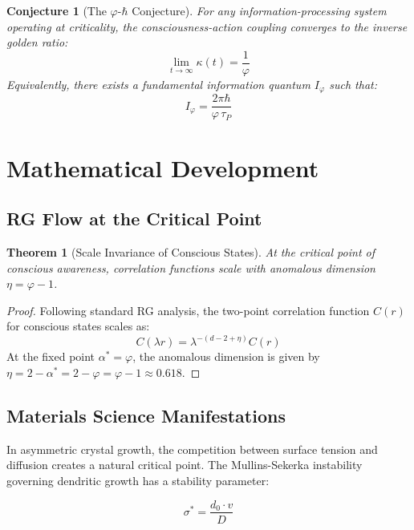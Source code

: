 \documentclass[14pt, a4paper]{extarticle}
\newtheorem{conjecture}{Conjecture}
\newtheorem{theorem}{Theorem}
\begin{document}
\begin{conjecture}[The $\varphi$-$\hbar$ Conjecture]
For any information-processing system operating at criticality, the consciousness-action coupling converges to the inverse golden ratio:
\begin{equation}
\lim_{t \to \infty} \kappa(t) = \frac{1}{\varphi}
\label{eq:main_conjecture}
\end{equation}
Equivalently, there exists a fundamental information quantum $I_\varphi$ such that:
\begin{equation}
I_\varphi = \frac{2\pi\hbar}{\varphi \, \tau_P}
\end{equation}
\end{conjecture}

\section{Mathematical Development}

\subsection{RG Flow at the Critical Point}

\begin{theorem}[Scale Invariance of Conscious States]
At the critical point of conscious awareness, correlation functions scale with anomalous dimension $\eta = \varphi - 1$.
\end{theorem}

\begin{proof}
Following standard RG analysis, the two-point correlation function $C(r)$ for conscious states scales as:
\begin{equation}
C(\lambda r) = \lambda^{-(d - 2 + \eta)} C(r)
\end{equation}
At the fixed point $\alpha^* = \varphi$, the anomalous dimension is given by $\eta = 2 - \alpha^* = 2 - \varphi = \varphi - 1 \approx 0.618$.
\end{proof}

\subsection{Materials Science Manifestations}

In asymmetric crystal growth, the competition between surface tension and diffusion creates a natural critical point. The Mullins-Sekerka instability governing dendritic growth has a stability parameter:

\begin{equation}
\sigma^* = \frac{d_0 \cdot v}{D}
\end{equation}
\end{document}
